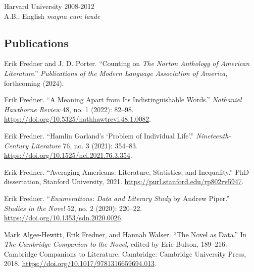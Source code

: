\documentclass[
  12pt,
  letterpaper,
]{article}
\newlength{\cslhangindent}
\newlength{\cslentryspacingunit} %
\newenvironment{CSLReferences}[2] %
 {%
  \setlength{\parindent}{0pt}
  \ifodd #1
  \let\oldpar\par
  \def\par{\hangindent=\cslhangindent\oldpar}
  \fi
  \setlength{\parskip}{#2\cslentryspacingunit}
 }%
 {}
\begin{document}
Harvard University \hfill 2008-2012\\
\hspace*{0.333em} A.B., English \emph{magna cum laude}

\hypertarget{pubs}{%
\subsection{Publications}\label{pubs}}
\bigskip
\begin{CSLReferences}{1}{0}

\leavevmode{}%
Erik Fredner and J. D. Porter. {``Counting on {\emph{The Norton
Anthology of American Literature}}.''} \emph{Publications of the Modern Language Association of America}, forthcoming (2024).

\medskip

\leavevmode{}%
Erik Fredner. {``A {Meaning Apart} from {Its Indistinguishable
Words}.''} \emph{Nathaniel Hawthorne Review} 48, no. 1 (2022): 82--98.
\url{https://doi.org/10.5325/nathhawtrevi.48.1.0082}.

\medskip

\leavevmode{}%
Erik Fredner. {``Hamlin {Garland}'s {`{Problem} of {Individual Life}'}.''}
\emph{Nineteenth-Century Literature} 76, no. 3 (2021): 354--83.
\url{https://doi.org/10.1525/ncl.2021.76.3.354}.

\medskip

\leavevmode{}%
Erik Fredner. {``Averaging {Americans}: {Literature}, {Statistics}, and
{Inequality}.''} PhD dissertation, Stanford University, 2021.
\url{https://purl.stanford.edu/rp802rv5947}.

\medskip

\leavevmode{}%
Erik Fredner. {``\emph{Enumerations: {Data} and {Literary Study}} by {Andrew
Piper}.''} \emph{Studies in the Novel} 52, no. 2 (2020): 220--22.
\url{https://doi.org/10.1353/sdn.2020.0026}.

\medskip

\leavevmode{}%
Mark Algee-Hewitt, Erik Fredner, and Hannah Walser. {``The {Novel} as
{Data}.''} In \emph{The {Cambridge Companion} to the {Novel}}, edited by
Eric Bulson, 189--216. Cambridge {Companions} to {Literature}.
{Cambridge}: {Cambridge University Press}, 2018.
\url{https://doi.org/10.1017/9781316659694.013}.


\end{CSLReferences}
\end{document}
